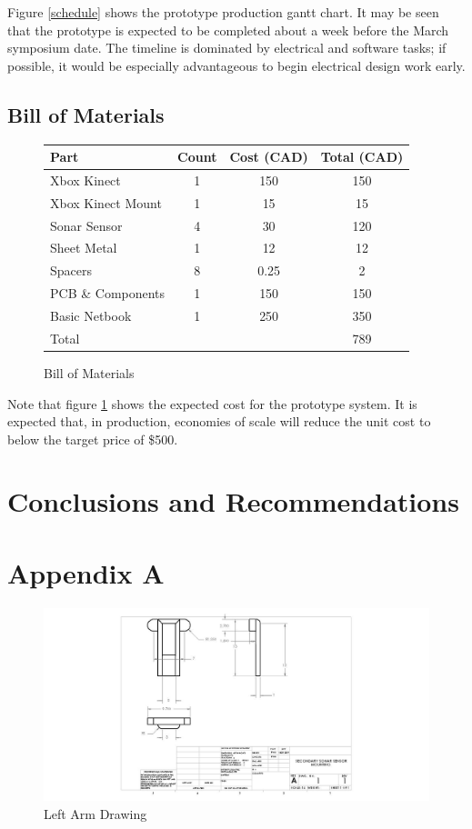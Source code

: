 \documentclass[oneside,final,a4paper]{report}
\begin{document}
Figure \ref{schedule} shows the prototype production gantt chart.  It may be seen that the prototype is expected to be completed about a week before the March symposium date.  The timeline is dominated by electrical and software tasks; if possible, it would be especially advantageous to begin electrical design work early.

\section{Bill of Materials}
\vspace{0.5cm}
\begin{figure}[ht]
\centering
\begin{tabular}{|l|c|c|c|}
\hline
Part & Count & Cost (CAD) & Total (CAD) \\
\hline \hline
Xbox Kinect & 1 & 150 & 150 \\
\hline
Xbox Kinect Mount & 1& 15 & 15 \\
Sonar Sensor & 4 & 30 & 120 \\
\hline
Sheet Metal & 1 & 12 & 12 \\
\hline
Spacers & 8 & 0.25 & 2 \\
\hline
PCB \& Components & 1 & 150 & 150 \\
\hline
Basic Netbook & 1 & 250 & 350 \\
\hline
\hline
Total&&&789\\
\hline
\end{tabular}
\caption{Bill of Materials}
\label{tab:BOM}
\end{figure}

Note that figure \ref{tab:BOM} shows the expected cost for the prototype system.  It is expected that, in production, economies of scale will reduce the unit cost to below the target price of \$500.

\chapter{Conclusions and Recommendations}

\chapter*{Appendix A} \label{mech_drawings}
\begin{figure}[hbt]
 \centering
 \includegraphics[scale=0.5]{Drawing_Left}
 \caption{Left Arm Drawing}
\end{figure}
\end{document}
